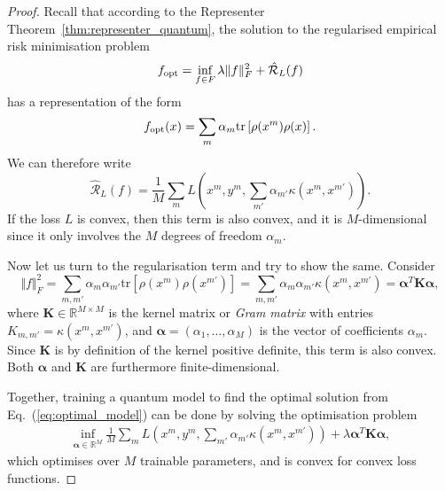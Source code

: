 \documentclass[aps, reprint, onecolumn, nofootinbib, longbibliography]{revtex4-2}
\newcommand{\tr}[1]{ \mathrm{tr}\left[#1\right] }
\begin{document}
\begin{proof}
Recall that according to the Representer Theorem~\ref{thm:representer_quantum}, the solution to the regularised empirical risk minimisation problem 
\begin{equation}f_{\rm opt} = \inf_{f \in F} \lambda \Vert f \Vert^2_{F} + \hat{\mathcal{R}}_{L}(f)  \end{equation} 
has a representation of the form 
\begin{equation}f_{\rm opt}(x) = \sum_m \alpha_m \tr{\rho(x^m) \rho(x)}.\end{equation}
We can therefore write 
\begin{equation}
    \hat{\mathcal{R}}_{L}(f) = \frac{1}{M} \sum_{m} L(x^m, y^m, \sum_{m'} \alpha_{m'} \kappa(x^m, x^{m'})).
\end{equation}
If the loss $L$ is convex, then this term is also convex, and it is $M$-dimensional since it only involves the $M$ degrees of freedom $\alpha_m$. 

Now let us turn to the regularisation term and try to show the same. Consider
\begin{equation} \Vert f \Vert^2_{F} = \sum_{m, m'} \alpha_m \alpha_{m'} \tr{\rho(x^m)\rho(x^{m'})} =  \sum_{m, m'} \alpha_m \alpha_{m'} \kappa(x^m, x^{m'}) = \boldsymbol\alpha^T \mathbf{K} \boldsymbol\alpha, \end{equation}
where $\mathbf{K} \in \mathbb{R}^{M \times M}$ is the kernel matrix or \textit{Gram matrix} with entries $K_{m, m'} = \kappa(x^m, x^{m'})$, and $\boldsymbol\alpha = (\alpha_1, \dots, \alpha_M)$ is the vector of coefficients $\alpha_m$. Since $\mathbf{K}$ is by definition of the kernel positive definite, this term is also convex. Both $\boldsymbol\alpha$ and $\mathbf{K}$ are furthermore finite-dimensional.

Together, training a quantum model to find the optimal solution from Eq.~(\ref{eq:optimal_model}) can be done by solving the optimisation problem
\begin{align} \label{eq:opt_problem}
    \inf_{\boldsymbol\alpha \in \mathbb{R}^M} \frac{1}{M} \sum_{m} L(x^m, y^m, \sum_{m'} \alpha_{m'} \kappa(x^m, x^{m'}))  + \lambda \boldsymbol\alpha^T \mathbf{K} \boldsymbol\alpha,
\end{align}
which optimises over $M$ trainable parameters, and is convex for convex loss functions.
\end{proof}
\end{document}
